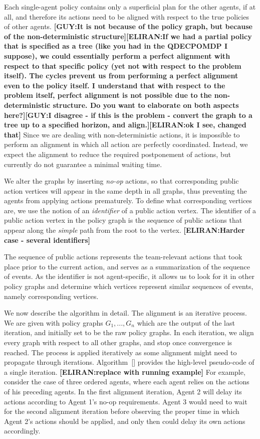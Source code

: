 \documentclass[letterpaper]{article} %
\newcommand{\eliran}[1]{\textbf{[\color{red}ELIRAN:#1]}}
\newcommand{\guy}[1]{\textbf{[\color{orange}GUY:#1]}}
\begin{document}
Each single-agent policy contains only a superficial plan for the other agents, if at all, and therefore its actions need to be aligned with respect to the true policies of other agents. 
\guy{It is not because of the policy graph, but because of the non-deterministic structure}\eliran{If we had a partial policy that is specified as a tree (like you had in the QDECPOMDP I suppose), we could essentially perform a perfect alignment with respect to that specific policy (yet not with respect to the problem itself). The cycles prevent us from performing a perfect alignment even to the policy itself. I understand that with respect to the problem itself, perfect alignment is not possible due to the non-deterministic structure. Do you want to elaborate on both aspects here?}\guy{I disagree - if this is the problem - convert the graph to a tree up to a specified horizon, and align.}\eliran{ok I see, changed that}
Since we are dealing with non-deterministic actions, it is impossible to perform an alignment in which all action are perfectly coordinated.
Instead, we expect the alignment to reduce the required postponement of actions, but currently do not guarantee a minimal waiting time.

We alter the graphs by inserting \emph{no-op} actions, so that corresponding public action vertices will appear in the same depth in all graphs, thus preventing the agents from applying actions prematurely.
To define what corresponding vertices are, we use the notion of an \emph{identifier} of a public action vertex. The identifier of a public action vertex in the policy graph is the
sequence of public actions that appear along the \emph{simple} path from the root to the vertex.
\eliran{Harder case - several identifiers}

The sequence of public actions represents the team-relevant actions that took place prior to the current action, and serves as a summarization of the sequence of events. As the identifier is not agent-specific, it allows us to look for it in other policy graphs and determine which vertices represent similar
sequences of events, namely corresponding vertices.

We now describe the algorithm in detail.
The alignment is an iterative process. We are given with policy graphs $G_1,...,G_n$ which are the output of the last iteration, and initially set to be the raw policy graphs. In each iteration, we align every graph with respect to all other graphs, and stop once convergence is reached. The process is applied iteratively as some alignment might need to propagate through iterations. Algorithm~\ref{} provides the high-level pseudo-code of a single iteration.
\eliran{replace with running example}
For example, consider the case of three ordered agents, where each agent relies on the actions of his preceding agents. In the first alignment iteration, Agent 2 will delay its actions according to Agent 1's no-op requirements. Agent 3 would need to wait for the second alignment iteration before observing the proper time in which Agent 2's actions should be applied, and only then could delay its own actions accordingly.
\end{document}
